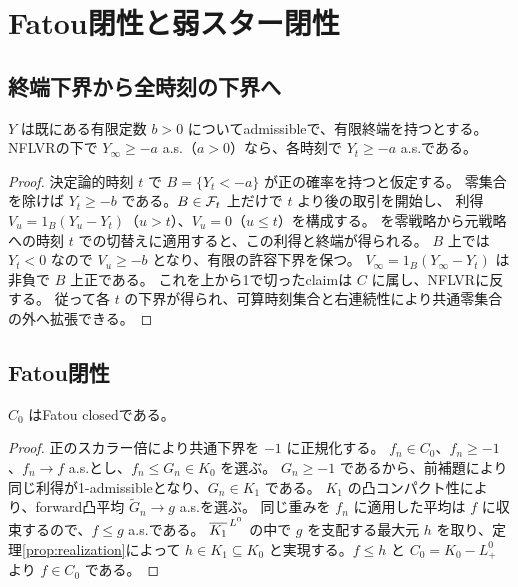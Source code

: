 \section{Fatou閉性と弱スター閉性}
\label{sec:fatou}

\subsection{終端下界から全時刻の下界へ}
\begin{lemma}[終端下界の伝播]
\label{lem:terminal-running}
$Y$ は既にある有限定数 $b>0$ についてadmissibleで、有限終端を持つとする。
NFLVRの下で $Y_\infty\geq-a$ a.s.（$a>0$）なら、各時刻で $Y_t\geq-a$ a.s.である。
\end{lemma}
\begin{proof}
決定論的時刻 $t$ で $B=\{Y_t<-a\}$ が正の確率を持つと仮定する。
零集合を除けば $Y_t\geq-b$ である。$B\in\mathcal F_t$ 上だけで $t$ より後の取引を開始し、
利得 $V_u=1_B(Y_u-Y_t)$（$u>t$）、$V_u=0$（$u\leq t$）を構成する。
を零戦略から元戦略への時刻 $t$ での切替えに適用すると、この利得と終端が得られる。
$B$ 上では $Y_t<0$ なので $V_u\geq-b$ となり、有限の許容下界を保つ。
$V_\infty=1_B(Y_\infty-Y_t)$ は非負で $B$ 上正である。
これを上から1で切ったclaimは $C$ に属し、NFLVRに反する。
従って各 $t$ の下界が得られ、可算時刻集合と右連続性により共通零集合の外へ拡張できる。
\end{proof}

\subsection{Fatou閉性}
\begin{theorem}
\label{thm:fatou}
$C_0$ はFatou closedである。
\end{theorem}
\begin{proof}
正のスカラー倍により共通下界を $-1$ に正規化する。
$f_n\in C_0$、$f_n\geq-1$、$f_n\to f$ a.s.とし、$f_n\leq G_n\in K_0$ を選ぶ。
$G_n\geq-1$ であるから、前補題により同じ利得が1-admissibleとなり、$G_n\in K_1$ である。
$K_1$ の凸コンパクト性により、forward凸平均 $\widetilde G_n\to g$ a.s.を選ぶ。
同じ重みを $f_n$ に適用した平均は $f$ に収束するので、$f\leq g$ a.s.である。
$\overline{K_1}^{\,L^0}$ の中で $g$ を支配する最大元 $h$ を取り、定理\ref{prop:realization}によって
$h\in K_1\subseteq K_0$ と実現する。$f\leq h$ と $C_0=K_0-L^0_+$ より $f\in C_0$ である。
\end{proof}


